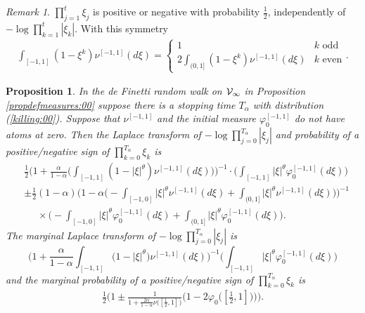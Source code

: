 \documentclass[preprint,11pt]{elsarticle}
\newtheorem{Proposition}{Proposition}
\theoremstyle{remark}
\newtheorem{Remark}{Remark}
\def\spin{{[-1,1]}}
\begin{document}
{\begin{Remark}
$\prod_{j=1}^t\xi_j$ is positive or negative with probability $\frac{1}{2}$, independently of 
 $-\log \prod_{k=1}^t|\xi_k|$.  With this symmetry
 \begin{align}
 \int_\spin(1-\xi^k)\nu^\spin(d\xi)
 = \begin{cases} 
 1&k\text{~odd}\\
 2\int_{(0,1]}(1-\xi^k)\nu^\spin(d\xi)&k \text{~even}
 \end{cases}.
 \label{symmetric:01}
 \end{align}
\end{Remark}
%
\begin{Proposition}\label{propkilled:00}
In the de Finetti random walk on ${\cal V}_\infty$ in Proposition \ref{propdefmeasures:00}
suppose there is a stopping time $T_\alpha$ with distribution (\ref{killing:00}). 
Suppose that $\nu^\spin$ and the initial measure $\varphi_0^\spin$ do not have atoms at zero.
Then the Laplace transform of $-\log \prod_{j=0}^{T_\alpha}|\xi_j|$ 
and probability of a positive/negative
sign of 
$\prod_{k=0}^{T_\alpha}\xi_k$
is 
\begin{align}
&\frac{1}{2}\Bigg ( 
1 + \frac{\alpha}{1-\alpha} \Big (\int_{[-1,1]}(1-|\xi|^\theta)\nu^\spin(d\xi) \Big )\Bigg )^{-1}
\cdot\Bigg (\int_{[-1,1]}|\xi|^\theta\varphi^\spin_0(d\xi)\Bigg )\nonumber\\
&\pm 
\frac{1}{2}(1-\alpha)\Bigg ( 
1 - \alpha \Big (-\int_{[-1,0]}|\xi|^\theta\nu^\spin(d\xi)  +\int_{(0,1]}|\xi|^\theta \nu^\spin(d\xi)\Big )\Bigg )^{-1}\nonumber\\
&~~~~~~\times\Bigg (-\int_{[-1,0]}|\xi|^\theta\varphi^\spin_0(d\xi)+\int_{(0,1]}|\xi|^\theta\varphi^\spin_0(d\xi)\Bigg ).
\label{LT:45}
\end{align}
The marginal Laplace transform of $-\log \prod_{j=0}^{T_\alpha}|\xi_j|$ is
\begin{equation}
\Bigg ( 1 + \frac{\alpha}{1-\alpha}\int_\spin\big (1-|\xi|^\theta\big )\nu^\spin(d\xi)\Bigg )^{-1}\Big (\int_{[-1,1]}|\xi|^\theta\varphi_0^\spin(d\xi)\Big )
\label{LT:46}
\end{equation}
and the marginal probability of a positive/negative
sign of %
$\prod_{k=0}^{T_\alpha}\xi_k$ is 
\begin{align}
\frac{1}{2}\Bigg (
1 \pm \frac{1}{1 + \frac{2\alpha}{1-\alpha}\nu\big( [\frac{1}{2},1]\big )}
\Big (1 -2 \varphi_0\big( [\frac{1}{2},1]\big )\Big )\Bigg ).
\label{spinprob:00}
\end{align}

\end{Proposition}}
\end{document}
